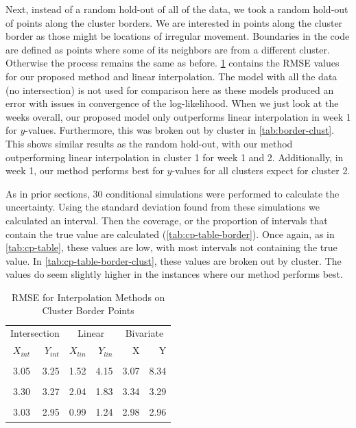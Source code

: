 \documentclass[12pt]{article}
\begin{document}
Next, instead of a random hold-out of all of the data, we took a random
hold-out of points along the cluster borders. We are interested in
points along the cluster border as those might be locations of irregular
movement. Boundaries in the code are defined as points where some of its
neighbors are from a different cluster. Otherwise the process remains
the same as before. \cref{tab:border-cv-rmse} contains the RMSE values
for our proposed method and linear interpolation. The model with all the
data (no intersection) is not used for comparison here as these models
produced an error with issues in convergence of the log-likelihood. When
we just look at the weeks overall, our proposed model only outperforms
linear interpolation in week 1 for \(y\)-values. Furthermore, this was
broken out by cluster in \cref{tab:border-clust}. This shows similar
results as the random hold-out, with our method outperforming linear
interpolation in cluster 1 for week 1 and 2. Additionally, in week 1,
our method performs best for \(y\)-values for all clusters expect for
cluster 2.

As in prior sections, 30 conditional simulations were performed to
calculate the uncertainty. Using the standard deviation found from these
simulations we calculated an interval. Then the coverage, or the
proportion of intervals that contain the true value are calculated
(\cref{tab:cp-table-border}). Once again, as in \cref{tab:cp-table},
these values are low, with most intervals not containing the true value.
In \cref{tab:cp-table-border-clust}, these values are broken out by
cluster. The values do seem slightly higher in the instances where our
method performs best.

\begin{table}

\caption{\label{tab:border-cv-rmse}RMSE for Interpolation Methods on Cluster Border Points}
\centering
\begin{tabular}[t]{rrrrrr}
\toprule
\multicolumn{2}{c}{Intersection} & \multicolumn{2}{c}{Linear} & \multicolumn{2}{c}{Bivariate} \\
\cmidrule(l{3pt}r{3pt}){1-2} \cmidrule(l{3pt}r{3pt}){3-4} \cmidrule(l{3pt}r{3pt}){5-6}
$X_{int}$ & $Y_{int}$ & $X_{lin}$ & $Y_{lin}$ & X & Y\\
\midrule
\addlinespace[0.3em]
\multicolumn{6}{l}{\textbf{Week 1}}\\
\hspace{1em}3.05 & 3.25 & 1.52 & 4.15 & 3.07 & 8.34\\
\addlinespace[0.3em]
\multicolumn{6}{l}{\textbf{Week 2}}\\
\hspace{1em}3.30 & 3.27 & 2.04 & 1.83 & 3.34 & 3.29\\
\addlinespace[0.3em]
\multicolumn{6}{l}{\textbf{Week 3}}\\
\hspace{1em}3.03 & 2.95 & 0.99 & 1.24 & 2.98 & 2.96\\
\bottomrule
\end{tabular}
\end{table}
\end{document}
